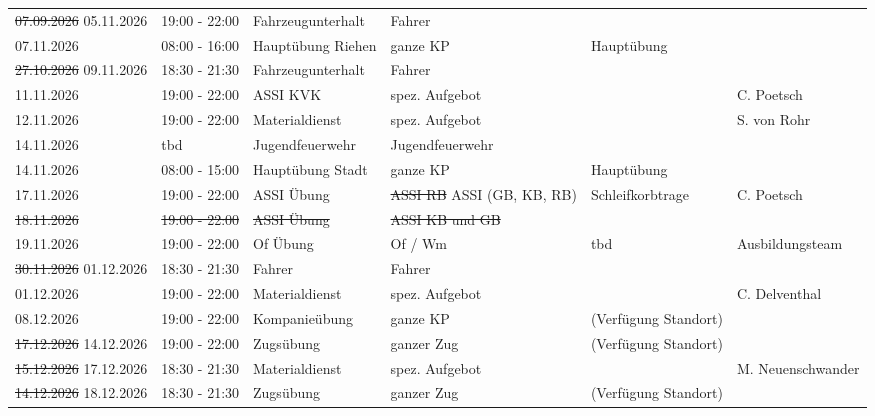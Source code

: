 \documentclass[11pt,a4paper]{article}
\begin{document}
\begin{adjustwidth}{1.5cm}{1.5cm}
\begin{longtable}{llllll}
\color{BrickRed}\sout{07.09.2026} \color{OliveGreen}05.11.2026 & 19:00 - 22:00 & Fahrzeugunterhalt & Fahrer & \color{OliveGreen} & \color{OliveGreen} \\
07.11.2026 & 08:00 - 16:00 & Haupt\"ubung Riehen & ganze KP & \color{OliveGreen}Haupt\"ubung & \color{OliveGreen} \\
\color{BrickRed}\sout{27.10.2026} \color{OliveGreen}09.11.2026 & 18:30 - 21:30 & Fahrzeugunterhalt & Fahrer & \color{OliveGreen} & \color{OliveGreen} \\
11.11.2026 & 19:00 - 22:00 & ASSI KVK & spez. Aufgebot & \color{OliveGreen} & \color{OliveGreen}C. Poetsch \\
12.11.2026 & 19:00 - 22:00 & Materialdienst & spez. Aufgebot & \color{OliveGreen} & \color{OliveGreen}S. von Rohr \\
\color{OliveGreen}14.11.2026 & \color{OliveGreen}tbd & \color{OliveGreen}Jugendfeuerwehr & \color{OliveGreen}Jugendfeuerwehr & \color{OliveGreen} & \color{OliveGreen} \\
14.11.2026 & 08:00 - 15:00 & Haupt\"ubung Stadt & ganze KP & \color{OliveGreen}Haupt\"ubung & \color{OliveGreen} \\
17.11.2026 & 19:00 - 22:00 & ASSI \"Ubung & \color{BrickRed}\sout{ASSI RB} \color{OliveGreen}ASSI (GB, KB, RB) & \color{OliveGreen}Schleifkorbtrage & \color{OliveGreen}C. Poetsch \\
\color{BrickRed}\sout{18.11.2026} & \color{BrickRed}\sout{19:00 - 22:00} & \color{BrickRed}\sout{ASSI \"Ubung} & \color{BrickRed}\sout{ASSI KB und GB} & \color{BrickRed}\sout{} & \color{BrickRed}\sout{} \\
19.11.2026 & 19:00 - 22:00 & Of \"Ubung & Of / Wm & \color{OliveGreen}tbd & \color{OliveGreen}Ausbildungsteam \\
\color{BrickRed}\sout{30.11.2026} \color{OliveGreen}01.12.2026 & 18:30 - 21:30 & Fahrer & Fahrer & \color{OliveGreen} & \color{OliveGreen} \\
01.12.2026 & 19:00 - 22:00 & Materialdienst & spez. Aufgebot & \color{OliveGreen} & \color{OliveGreen}C. Delventhal \\
08.12.2026 & 19:00 - 22:00 & Kompanie\"ubung & ganze KP & \color{OliveGreen}(Verf\"ugung Standort) & \color{OliveGreen} \\
\color{BrickRed}\sout{17.12.2026} \color{OliveGreen}14.12.2026 & 19:00 - 22:00 & Zugs\"ubung & ganzer Zug & \color{OliveGreen}(Verf\"ugung Standort) & \color{OliveGreen} \\
\color{BrickRed}\sout{15.12.2026} \color{OliveGreen}17.12.2026 & 18:30 - 21:30 & Materialdienst & spez. Aufgebot & \color{OliveGreen} & \color{OliveGreen}M. Neuenschwander \\
\color{BrickRed}\sout{14.12.2026} \color{OliveGreen}18.12.2026 & 18:30 - 21:30 & Zugs\"ubung & ganzer Zug & \color{OliveGreen}(Verf\"ugung Standort) & \color{OliveGreen} \\
\end{longtable}


\end{adjustwidth}
\end{document}
